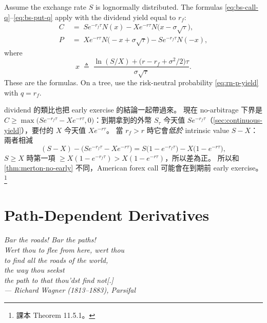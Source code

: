 
Assume the exchange rate $S$ is lognormally distributed.
The formulas \eqref{eq:bs-call-q}--\eqref{eq:bs-put-q} apply with the dividend yield equal to $r_{f}$:
\begin{align}
	C & \;=\; Se^{-r_{f}\tau}N(x)-Xe^{-r\tau}N\bigl(x-\sigma\sqrt{\tau}\bigr) , \label{eq:forex-call} \\
	P & \;=\; Xe^{-r\tau}N\bigl(-x+\sigma\sqrt{\tau}\bigr)-Se^{-r_{f}\tau}N(-x) , \label{eq:forex-put}
\end{align}
where
\[
	x \;\triangleq\; \frac{\ln(S/X)+\bigl(r-r_{f}+\sigma^{2}/2\bigr)\tau}{\sigma\sqrt{\tau}} .
\]
\suppstart
These are the  formulas.
On a tree, use the risk-neutral probability \eqref{eq:rn-p-yield} with $q=r_{f}$.


\begin{note}
	dividend 的類比也把 early exercise 的結論一起帶過來。
	現在 no-arbitrage 下界是 $C\ge\max\bigl(Se^{-r_{f}\tau}-Xe^{-r\tau},0\bigr)$：到期拿到的外幣 $S_{\tau}$ 今天值 $Se^{-r_{f}\tau}$（\autoref{sec:continuous-yield}），要付的 $X$ 今天值 $Xe^{-r\tau}$。
	當 $r_{f}>r$ 時它會\emph{低於} intrinsic value $S-X$：兩者相減
	\[
		(S-X)-\bigl(Se^{-r_{f}\tau}-Xe^{-r\tau}\bigr)=S\bigl(1-e^{-r_{f}\tau}\bigr)-X\bigl(1-e^{-r\tau}\bigr) ,
	\]
	$S\ge X$ 時第一項 $\ge X(1-e^{-r_{f}\tau})>X(1-e^{-r\tau})$，所以差為正。
	所以和 \autoref{thm:merton-no-early} 不同，American forex call 可能會在到期前 early exercise。\footnote{課本 Theorem 11.5.1。}
\end{note}
\suppend

\section{Path-Dependent Derivatives}
\label{sec:path-dependent}


\begin{flushright}
	\itshape Bar the roads! Bar the paths!\\
	Wert thou to flee from here, wert thou\\
	to find all the roads of the world,\\
	the way thou seekst\\
	the path to that thou'dst find not[.]\\
	\upshape --- Richard Wagner (1813--1883), \itshape Parsifal
\end{flushright}

